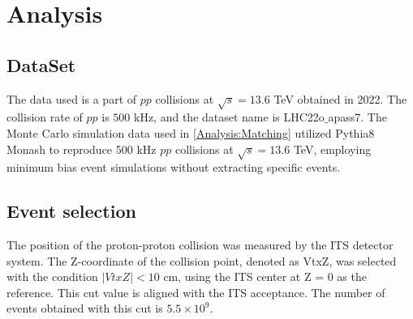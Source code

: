 \section{Analysis}
\label{Analysis}
    \subsection{DataSet}
    \label{DataSet}
        The data used is a part of $pp$ collisions at $\sqrt{s}=13.6$ TeV obtained in 2022. The collision rate of $pp$ is $500$ kHz, and the dataset name is LHC22o$\_$apass7.\@
        The Monte Carlo simulation data used in \ref{Analysis:Matching} utilized Pythia8 Monash to reproduce 500 kHz $pp$ collisions at $\sqrt{s}=13.6$ TeV, employing minimum bias event simulations without extracting specific events.
        
    \subsection{Event selection}
    \label{Event_selection}
        The position of the proton-proton collision was measured by the ITS detector system. The Z-coordinate of the collision point, denoted as VtxZ, was selected with the condition $|VtxZ| < 10$ cm, using the ITS center at Z = 0 as the reference. This cut value is aligned with the ITS acceptance. The number of events obtained with this cut is $5.5 \times 10^9$.\@

